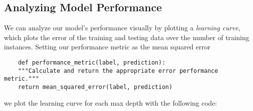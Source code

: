 \documentclass[12 pt]{article}
\numberwithin{equation}{section}
\begin{document}
\subsection{Analyzing Model Performance}
We can analyze our model's performance visually by plotting a \emph{learning curve}, which plots the error of the training and testing data over the number of training instances. Setting our performance metric as the mean squared error

\begin{verbatim}
	def performance_metric(label, prediction):
    """Calculate and return the appropriate error performance metric."""
    return mean_squared_error(label, prediction)
\end{verbatim}

we plot the learning curve for each max depth with the following code:
\end{document}
